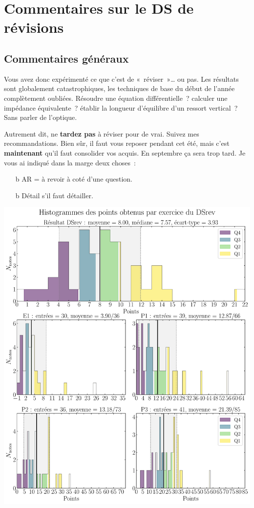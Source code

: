 \documentclass[a4paper, 10pt, final, garamond]{book}
\begin{document}
\setcounter{chapter}{0}

\def\lspace{25}

\chapter{Commentaires sur le DS de révisions}
\section{Commentaires généraux}

Vous avez donc expérimenté ce que c'est de «~réviser~»… ou pas. Les résultats
sont globalement catastrophiques, les techniques de base du début de l'année
complètement oubliées. Résoudre une équation différentielle~? calculer une
impédance équivalente~? établir la longueur d'équilibre d'un ressort vertical~?
Sans parler de l'optique.

Autrement dit, ne \textbf{tardez pas} à réviser pour de vrai. Suivez mes
recommandations. Bien sûr, il faut vous reposer pendant cet été, mais c'est
\textbf{maintenant} qu'il faut consolider vos acquis. En septembre ça sera trop
tard. Je vous ai indiqué dans la marge deux choses~:
\begin{itemize}
	\item[b]{AR = à revoir} à coté d'une question.
	\item[b]{Détail} s'il faut détailler.
\end{itemize}

\begin{center}
	\includegraphics[width=.87\linewidth]{DSrev_hist_all}
\end{center}
\end{document}
